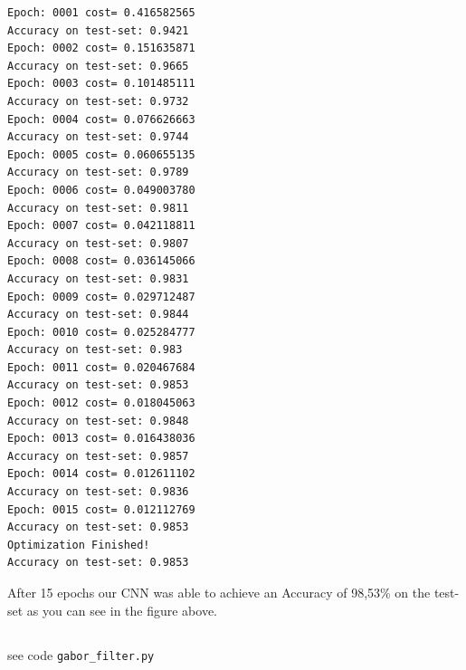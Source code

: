 \documentclass[12pt]{article}
\begin{document}
\newpage
\begin{verbatim}
Epoch: 0001 cost= 0.416582565
Accuracy on test-set: 0.9421
Epoch: 0002 cost= 0.151635871
Accuracy on test-set: 0.9665
Epoch: 0003 cost= 0.101485111
Accuracy on test-set: 0.9732
Epoch: 0004 cost= 0.076626663
Accuracy on test-set: 0.9744
Epoch: 0005 cost= 0.060655135
Accuracy on test-set: 0.9789
Epoch: 0006 cost= 0.049003780
Accuracy on test-set: 0.9811
Epoch: 0007 cost= 0.042118811
Accuracy on test-set: 0.9807
Epoch: 0008 cost= 0.036145066
Accuracy on test-set: 0.9831
Epoch: 0009 cost= 0.029712487
Accuracy on test-set: 0.9844
Epoch: 0010 cost= 0.025284777
Accuracy on test-set: 0.983
Epoch: 0011 cost= 0.020467684
Accuracy on test-set: 0.9853
Epoch: 0012 cost= 0.018045063
Accuracy on test-set: 0.9848
Epoch: 0013 cost= 0.016438036
Accuracy on test-set: 0.9857
Epoch: 0014 cost= 0.012611102
Accuracy on test-set: 0.9836
Epoch: 0015 cost= 0.012112769
Accuracy on test-set: 0.9853
Optimization Finished!
Accuracy on test-set: 0.9853
\end{verbatim}

After 15 epochs our CNN was able to achieve an Accuracy of 98,53\% on the test-set as you can see in the figure above.


\newpage
\subsection{ }
see code \verb!gabor_filter.py!
\end{document}
